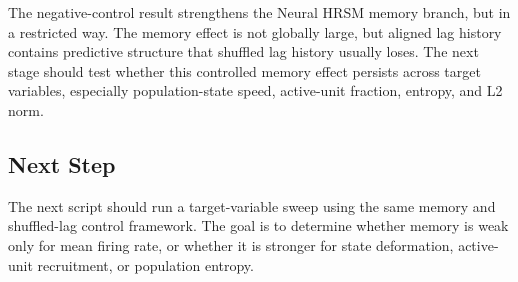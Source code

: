 The negative-control result strengthens the Neural HRSM memory branch, but in a restricted way. The memory effect is not globally large, but aligned lag history contains predictive structure that shuffled lag history usually loses. The next stage should test whether this controlled memory effect persists across target variables, especially population-state speed, active-unit fraction, entropy, and L2 norm.

\subsection{Next Step}

The next script should run a target-variable sweep using the same memory and shuffled-lag control framework. The goal is to determine whether memory is weak only for mean firing rate, or whether it is stronger for state deformation, active-unit recruitment, or population entropy.
